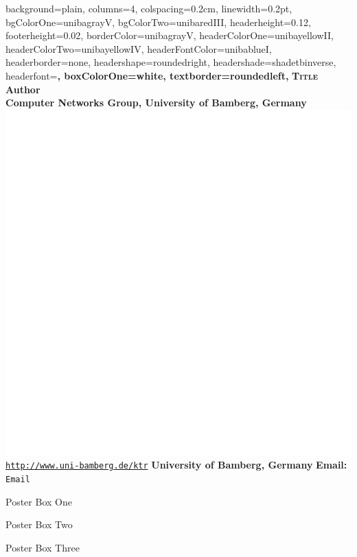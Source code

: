 \documentclass[a0paper,
landscape,
fontscale=0.332,
debug,
hyperref={pdfpagelabels=false}]{baposter}
\begin{document}
\begin{poster}{
  background=plain,%
  columns=4,
  colspacing=0.2cm,
  linewidth=0.2pt,
  bgColorOne=unibagrayV,
  bgColorTwo=unibaredIII,
  headerheight=0.12\textheight,
  footerheight=0.02\textheight,
  borderColor=unibagrayV,
  headerColorOne=unibayellowII,
  headerColorTwo=unibayellowIV,
  headerFontColor=unibablueI,
  headerborder=none,
  headershape=roundedright,
  headershade=shadetbinverse,%
  headerfont=\large\bf,
  boxColorOne=white,
  textborder=roundedleft,
}
{}
 {\Huge\textcolor{unibayellowI}{\textbf{\textsc{Title}}}\normalsize}
 {\LARGE\textcolor{unibagrayV}{\textbf{Author}}\normalsize\\[.5em]
 {\Large\textcolor{unibagrayIV}{\textbf{Computer Networks Group, University of Bamberg, Germany}}\normalsize}}
{\includegraphics[width=.07\linewidth]{images/logow}}
{\textcolor{unibablueI}{\texttt{\url{http://www.uni-bamberg.de/ktr}}}}
{\textcolor{unibablueI}{\textbf{University of Bamberg, Germany}}}
{\textcolor{unibablueI}{\textbf{Email:} \texttt{Email}}}


\begin{posterbox}[column=0, name=posterboxOne, height=auto]{Poster Box One}

\end{posterbox}

\begin{posterbox}[column=1, span=2,height=auto, name=posterboxTwo, boxpadding=1em]{Poster Box Two}

\end{posterbox}

\begin{posterbox}[column=0,span=2,below=auto,height=bottom, name=posterboxThree]{Poster Box Three}

\end{posterbox}


\end{poster}
\end{document}
